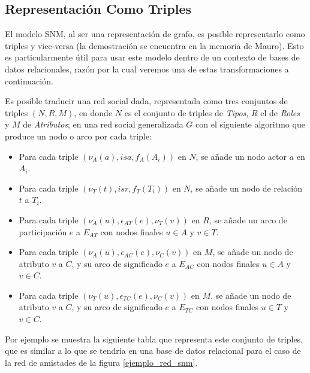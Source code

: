 
\subsection{Representación Como Triples} %
\label{sub:representacion_como_triples}

El modelo SNM, al ser una representación de grafo, es posible representarlo como triples y vice-versa (la demostración se encuentra en la memoria de Mauro\cite{tesismauro}). Esto es particularmente útil para usar este modelo dentro de un contexto de bases de datos relacionales, razón por la cual veremos una de estas transformaciones a continuación.

Es posible traducir una red social dada, representada como tres conjuntos de triples $(N, R, M)$, en donde $N$ es el conjunto de triples de \emph{Tipos}, $R$ el de \emph{Roles} y $M$ de \emph{Atributos}; en una red social generalizada $G$ con el siguiente algoritmo que produce un nodo o arco por cada triple:

\begin{itemize}
  \item Para cada triple $(\nu_A(a), isa, f_A(A_i))$ en $N$, se añade un nodo actor $a$ en $A_i$.
  \item Para cada triple $(\nu_T(t), isr, f_T(T_i))$ en $N$, se añade un nodo de relación $t$ a $T_i$.
  \item Para cada triple $(\nu_A(u), \epsilon_{AT}(e), \nu_T(v))$ en $R$, se añade un arco de participación $e$ a $E_{AT}$ con nodos finales $u \in A$ y $v \in T$.
  \item Para cada triple $(\nu_A(u), \epsilon_{AC}(e), \nu_C(v))$ en $M$, se añade un nodo de atributo $v$ a $C$, y su arco de significado $e$ a $E_{AC}$ con nodos finales $u \in A$ y $v \in C$.
  \item Para cada triple $(\nu_T(u), \epsilon_{TC}(e), \nu_C(v))$ en $M$, se añade un nodo de atributo $v$ a $C$, y su arco de significado $e$ a $E_{TC}$ con nodos finales $u \in T$ y $v \in C$.
\end{itemize}

Por ejemplo se muestra la siguiente tabla que representa este conjunto de triples, que es similar a lo que se tendría en una base de datos relacional para el caso de la red de amistades de la figura \ref{ejemplo_red_snm}.

